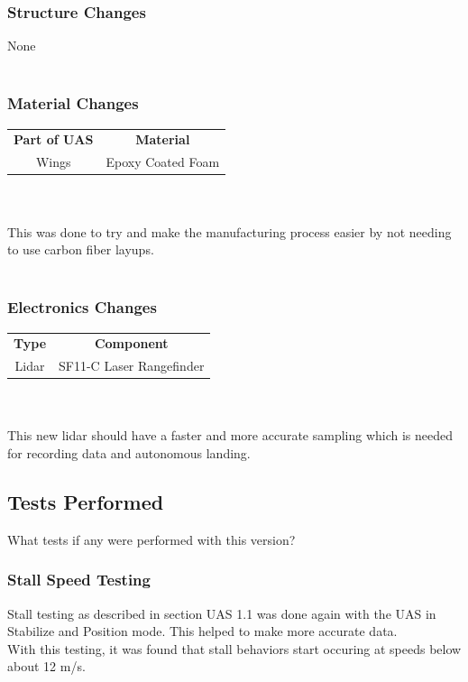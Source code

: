 \documentclass{article}
\begin{document}
\subsubsection*{Structure Changes}
None \\ \\

\subsubsection*{Material Changes}
 \begin{tabular}{ c c }
	\textbf{Part of UAS} & \textbf{Material}  \\ 
	 Wings & Epoxy Coated Foam  \\  
\end{tabular} \\ \\
This was done to try and make the manufacturing process easier by not needing to use carbon fiber layups. \\ \\

\subsubsection*{Electronics Changes}
\begin{tabular}{ c c }
	\textbf{Type} & \textbf{Component}  \\ 
	Lidar & SF11-C Laser Rangefinder
\end{tabular} \\ \\
This new lidar should have a faster and more accurate sampling which is needed for recording data and autonomous landing.

\subsection*{Tests Performed}
What tests if any were performed with this version?
\subsubsection*{Stall Speed Testing}
Stall testing as described in section UAS 1.1 was done again with the UAS in Stabilize and Position mode. This helped to make more accurate data. \\
With this testing, it was found that stall behaviors start occuring at speeds below about 12 m/s. \\ \\
\end{document}
